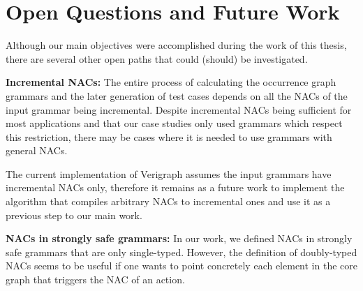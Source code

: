 \section{Open Questions and Future Work}

Although our main objectives were accomplished during the work of this thesis, there are several other open paths that could (should) be investigated. 






\textbf{Incremental NACs:} The entire process of calculating the occurrence graph grammars and the later generation of test cases depends on all the NACs of the input grammar being incremental. Despite incremental NACs being sufficient for most applications and that our case studies only used grammars which respect this restriction, there may be cases where it is needed to use grammars with general NACs.

  The current implementation of Verigraph assumes the input grammars have incremental NACs only, therefore it remains as a future work to implement the algorithm that compiles arbitrary NACs to incremental ones and use it as a previous step to our main work.

\textbf{NACs in strongly safe grammars:} In our work, we defined NACs in strongly safe grammars that are only single-typed. However, the definition of doubly-typed NACs seems to be useful if one wants to point concretely each element in the core graph that triggers the NAC of an action.

